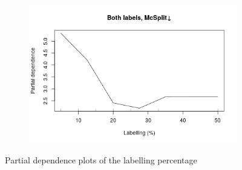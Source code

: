 \documentclass{l4proj}
\theoremstyle{definition}
\theoremstyle{remark}
\begin{document}
\begin{figure}
\begin{subfigure}[t]{0.49\textwidth}
    \includegraphics[width=\textwidth]{images/both_labels_mcsplitdown_labelling.png}
  \end{subfigure}
  \caption{Partial dependence plots of the labelling percentage}
  \label{fig:labelling_partials}
\end{figure}
\end{document}
